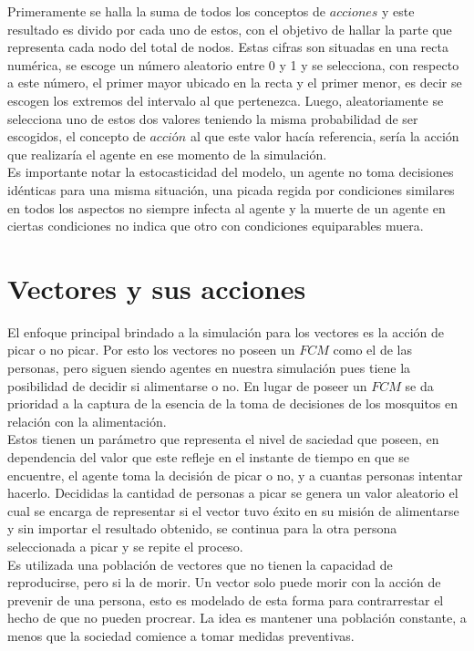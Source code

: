 Primeramente se halla la suma de todos los conceptos de $acciones$ y este resultado es divido por cada uno de 
estos, con el objetivo de hallar la parte que representa cada nodo del total de nodos. Estas cifras son
situadas en una recta numérica, se escoge un número aleatorio entre 0 y 1 y se selecciona, con respecto 
a este número, el primer mayor ubicado en la recta y el primer menor, es decir se escogen los extremos
del intervalo al que pertenezca. Luego, aleatoriamente se selecciona uno de estos dos valores teniendo
la misma probabilidad de ser escogidos, el concepto de $acci$ó$n$ al que este valor hacía referencia, sería
la acción que realizaría el agente en ese momento de la simulación.\\
Es importante notar la estocasticidad del modelo, un agente no toma decisiones idénticas para una misma
situación, una picada regida por condiciones similares en todos los aspectos no siempre infecta al agente 
y la muerte de un agente en ciertas condiciones no indica que otro con condiciones equiparables muera.\\

\section{Vectores y sus acciones}
El enfoque principal brindado a la simulación para los vectores es la acción de picar o no picar. Por esto
los vectores no poseen un $FCM$ como el de las personas, pero siguen siendo agentes en nuestra simulación
pues tiene la posibilidad de decidir si alimentarse o no. En lugar de poseer un $FCM$ se da prioridad a la 
captura de la esencia de la toma de decisiones de los mosquitos en relación con la alimentación.\\

Estos tienen un parámetro que representa el nivel de saciedad que poseen, en dependencia del valor que este
refleje en el instante de tiempo en que se encuentre, el agente toma la decisión de picar o no, y a cuantas 
personas intentar hacerlo. Decididas la cantidad de personas a picar se genera un valor aleatorio el cual 
se encarga de representar si el vector tuvo éxito en su misión de alimentarse y sin importar el resultado 
obtenido, se continua para la otra persona seleccionada a picar y se repite el proceso.\\

Es utilizada una población de vectores que no tienen la capacidad de reproducirse, pero si la de morir. Un vector
solo puede morir con la acción de prevenir de una persona, esto es modelado de esta forma para contrarrestar
el hecho de que no pueden procrear. La idea es mantener una población constante, a menos que la sociedad
comience a tomar medidas preventivas.\\

